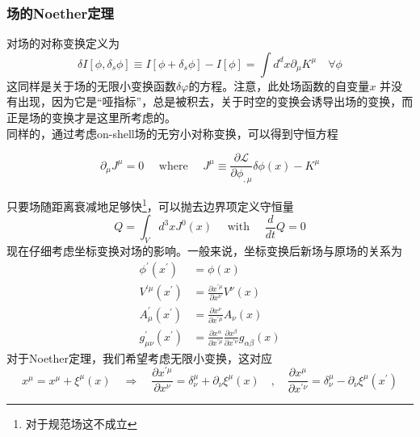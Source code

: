 \documentclass[10pt,openany]{book}
\theoremstyle{thmstyle} %
\theoremstyle{defstyle} %
\theoremstyle{prostyle} %
\begin{document}
\subsubsection{场的Noether定理}
对场的对称变换定义为
\begin{equation}
  \delta I\left[\phi, \delta_s \phi\right] \equiv I\left[\phi+\delta_s \phi\right]-I[\phi]=\int d^d x \partial_\mu K^\mu \quad \forall \phi
\end{equation}
这同样是关于场的无限小变换函数$ \delta \varphi $的方程。注意，此处场函数的自变量$ x $ 并没有出现，因为它是“哑指标”，总是被积去，关于时空的变换会诱导出场的变换，而正是场的变换才是这里所考虑的。\\
同样的，通过考虑on-shell场的无穷小对称变换，可以得到守恒方程
\begin{center}
\begin{equation}
  \partial_\mu J^\mu=0 \quad \text { where } \quad J^\mu \equiv \frac{\partial \mathcal{L}}{\partial \phi_{, \mu}} \delta \phi(x)-K^\mu
  \label{FNT}
\end{equation}
\end{center} 
只要场随距离衰减地足够快\footnote{对于规范场这不成立}，可以抛去边界项定义守恒量
\begin{equation}
  Q=\int_V d^3 x J^0(x) \quad \text { with } \quad \frac{d}{d t} Q=0
\end{equation}
现在仔细考虑坐标变换对场的影响。一般来说，坐标变换后新场与原场的关系为
\begin{equation}
\begin{aligned}
\phi^{\prime}\left(x^{\prime}\right) & =\phi(x) \\
V^{\prime \mu}\left(x^{\prime}\right) & =\frac{\partial x^{\prime \mu}}{\partial x^\nu} V^\nu(x) \\
A_\mu^{\prime}\left(x^{\prime}\right) & =\frac{\partial x^\nu}{\partial x^{\prime \mu}} A_\nu(x) \\
g_{\mu \nu}^{\prime}\left(x^{\prime}\right) & =\frac{\partial x^\alpha}{\partial x^{\prime \mu}} \frac{\partial x^\beta}{\partial x^{\prime \nu}} g_{\alpha \beta}(x)
\end{aligned}
\end{equation}
对于Noether定理，我们希望考虑无限小变换，这对应
\begin{equation}
  x^\mu=x^\mu+\xi^\mu(x) \quad \Rightarrow \quad \frac{\partial x^{\prime \mu}}{\partial x^\nu}=\delta_\nu^\mu+\partial_\nu \xi^\mu(x) \quad, \quad \frac{\partial x^\mu}{\partial x^{\prime \nu}}=\delta_\nu^\mu-\partial_\nu \xi^\mu\left(x^{\prime}\right)
\end{equation}
\end{document}
